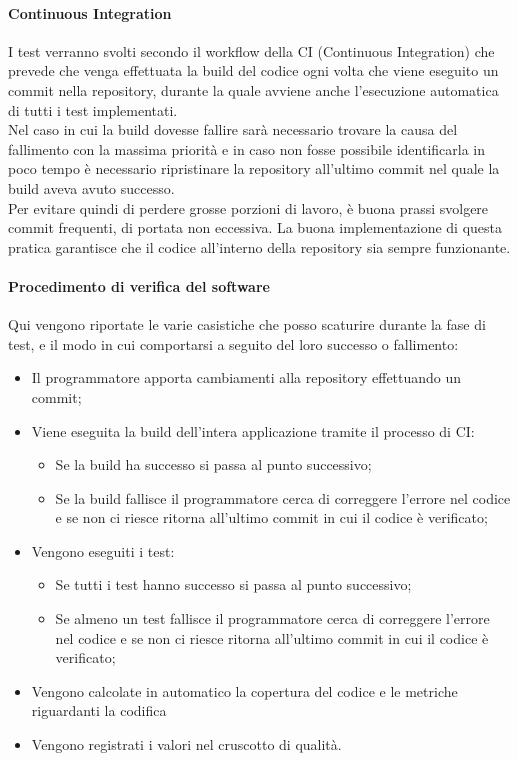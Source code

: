 \paragraph{Continuous Integration}
I test verranno svolti secondo il workflow della CI (Continuous Integration) che prevede che venga effettuata la build del codice ogni volta che viene eseguito un commit nella repository, durante la quale avviene anche l'esecuzione automatica di tutti i test implementati.\\
Nel caso in cui la build dovesse fallire sarà necessario trovare la causa del fallimento con la massima priorità e in caso non fosse possibile identificarla in poco tempo è necessario ripristinare la repository all'ultimo commit nel quale la build aveva avuto successo.\\
Per evitare quindi di perdere grosse porzioni di lavoro, è buona prassi svolgere commit frequenti, di portata non eccessiva.
La buona implementazione di questa pratica garantisce che il codice all'interno della repository sia sempre funzionante.

\paragraph{Procedimento di verifica del software}
Qui vengono riportate le varie casistiche che posso scaturire durante la fase di test, e il modo in cui comportarsi a seguito del loro successo o fallimento:
\begin{itemize}
	\item Il programmatore apporta cambiamenti alla repository effettuando un commit;
	\item Viene eseguita la build dell'intera applicazione tramite il processo di CI:
		\begin{itemize}
		\item Se la build ha successo si passa al punto successivo;
		\item Se la build fallisce il programmatore cerca di correggere l'errore nel codice e se non ci riesce ritorna all'ultimo commit in cui il codice è verificato;
		\end{itemize}
	\item Vengono eseguiti i test:
		\begin{itemize}
		\item Se tutti i test hanno successo si passa al punto successivo;
		\item Se almeno un test fallisce il programmatore cerca di correggere l'errore nel codice e se non ci riesce ritorna all'ultimo commit in cui il codice è verificato;
		\end{itemize}
	\item Vengono calcolate in automatico la copertura del codice e le metriche riguardanti la codifica
	\item Vengono registrati i valori nel cruscotto di qualità.
\end{itemize}

